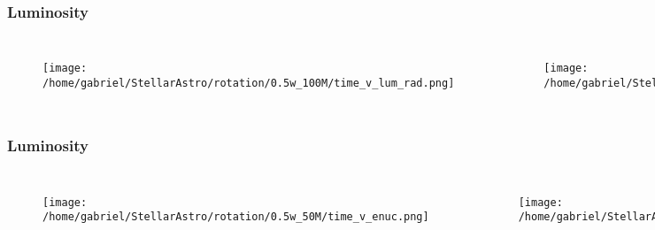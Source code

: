 \documentclass{beamer}
\begin{document}


\begin{frame}
\frametitle{Luminosity}
        \begin{columns}[c]
\begin{figure}
    \begin{center}
      \texttt{[image: /home/gabriel/StellarAstro/rotation/0.5w\_100M/time\_v\_lum\_rad.png]}
    \end{center}
  \end{figure}

        \begin{figure}
    \begin{center}
      \texttt{[image: /home/gabriel/StellarAstro/rotation/0.9w\_100M/time\_v\_lum\_rad.png]}
    \end{center}
  \end{figure}

        \end{columns}
\end{frame}



\begin{frame}
\frametitle{Luminosity}
        \begin{columns}[c]
\begin{figure}
    \begin{center}
      \texttt{[image: /home/gabriel/StellarAstro/rotation/0.5w\_50M/time\_v\_enuc.png]}
    \end{center}
  \end{figure}

        \begin{figure}
    \begin{center}
      \texttt{[image: /home/gabriel/StellarAstro/rotation/0.9w\_50M/time\_v\_enuc.png]}
    \end{center}
  \end{figure}

        \end{columns}
\end{frame}

\end{document}
